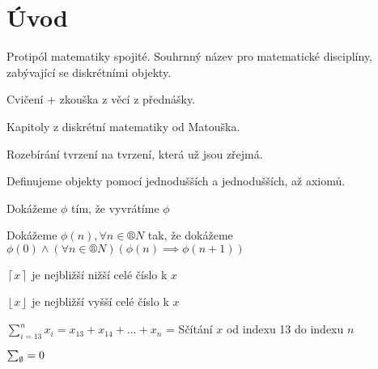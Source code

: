 \documentclass[12pt]{article}					%
\begin{document}
\section{Úvod}
    \begin{poznamka}
        Protipól matematiky spojité. Souhrnný název pro matematické disciplíny, zabývající se diskrétními objekty.
    \end{poznamka}

    \begin{poznamka}[Co je potřeba]
        Cvičení + zkouška z věcí z přednášky.
    \end{poznamka}

    \begin{poznamka}[literatura]
        Kapitoly z diskrétní matematiky od Matouška.
    \end{poznamka}

    \begin{definice}
        Rozebírání tvrzení na tvrzení, která už jsou zřejmá.
    \end{definice}

    \begin{definice}
        Definujeme objekty pomocí jednodušších a jednodušších, až axiomů.
    \end{definice}
    
    \begin{definice}
        Dokážeme $\phi$ tím, že vyvrátíme $\phi$
    \end{definice}

    \begin{definice}
            Dokážeme $\phi(n), \forall n \in ®N$ tak, že dokážeme $\phi(0)\land(\forall n \in ®N)(\phi(n)\implies\phi(n+1))$
    \end{definice}

    \begin{definice}
        $\left\lceil x\right\rceil$ je nejbližší nižší celé číslo k $x$

        $\left\lfloor x\right\rfloor$ je nejbližší vyšší celé číslo k $x$
    \end{definice}

    \begin{definice}
        $\sum_{i=13}^n x_i = x_{13} + x_{14} + … + x_n$ = Sčítání $x$ od indexu 13 do indexu $n$

        $\sum_\emptyset = 0$
    \end{definice}
\end{document}
